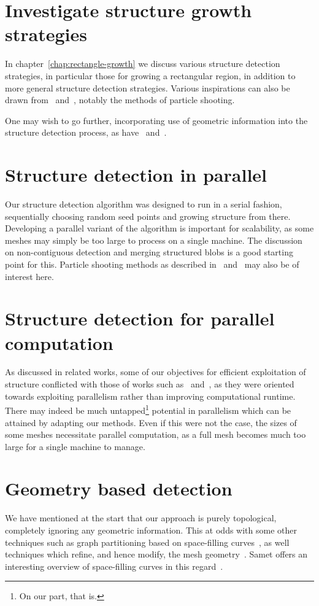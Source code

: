\section{Investigate structure growth strategies}
In chapter~\ref{chap:rectangle-growth} we discuss various structure detection strategies, in particular those for growing a rectangular region, in addition to more general structure detection strategies. Various inspirations can also be drawn from~\cite{eppstein2008motorcycle} and~\cite{eppstein2008approximate}, notably the methods of particle shooting.

One may wish to go further, incorporating use of geometric information into the structure detection process, as have~\cite{makem2012automatic} and~\cite{rocca2011fast}.


\section{Structure detection in parallel}
Our structure detection algorithm was designed to run in a serial fashion, sequentially choosing random seed points and growing structure from there. Developing a parallel variant of the algorithm is important for scalability, as some meshes may simply be too large to process on a single machine. The discussion on non-contiguous detection and merging structured blobs is a good starting point for this. Particle shooting methods as described in~\cite{eppstein2008motorcycle} and~\cite{eppstein2008approximate} may also be of interest here.

\section{Structure detection for parallel computation}
As discussed in related works, some of our objectives for efficient exploitation of structure conflicted with those of works such as~\cite{bergen2004hierarchical} and~\cite{li2004hierarchical}, as they were oriented towards exploiting parallelism rather than improving computational runtime. There may indeed be much untapped\footnote{On our part, that is.} potential in parallelism which can be attained by adapting our methods. Even if this were not the case, the sizes of some meshes necessitate parallel computation, as a full mesh becomes much too large for a single machine to manage.


\section{Geometry based detection}
We have mentioned at the start that our approach is purely topological, completely ignoring any geometric information. This at odds with some other techniques such as graph partitioning based on space-filling curves~\cite{ridley2010guide}, as well techniques which refine, and hence modify, the mesh geometry~\cite{bergen2004hierarchical}. Samet offers an interesting overview of space-filling curves in this regard~\cite{samet2006foundations}.

